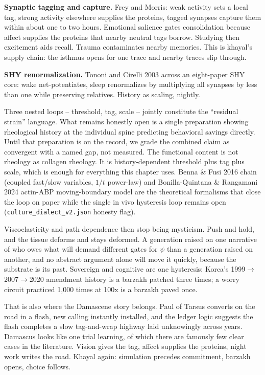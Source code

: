 \textbf{Synaptic tagging and capture.} Frey and Morris: weak activity sets a local tag, strong activity elsewhere supplies the proteins, tagged synapses capture them within about one to two hours. Emotional salience gates consolidation because affect supplies the proteins that nearby neutral tags borrow. Studying then excitement aids recall. Trauma contaminates nearby memories. This is khayal's supply chain: the isthmus opens for one trace and nearby traces slip through.

\textbf{SHY renormalization.} Tononi and Cirelli 2003 across an eight-paper SHY core: wake net-potentiates, sleep renormalizes by multiplying all synapses by less than one while preserving relatives. History as scaling, nightly.

Three nested loops -- threshold, tag, scale -- jointly constitute the ``residual strain'' language. What remains honestly open is a single preparation showing rheological history at the individual spine predicting behavioral savings directly. Until that preparation is on the record, we grade the combined claim as convergent with a named gap, not measured. The functional content is not rheology as collagen rheology. It is history-dependent threshold plus tag plus scale, which is enough for everything this chapter uses. Benna \& Fusi 2016 chain (coupled fast/slow variables, $1/t$ power-law) and Bonilla-Quintana \& Rangamani 2024 actin-ABP moving-boundary model are the theoretical formalisms that close the loop on paper while the single in vivo hysteresis loop remains open (\texttt{culture\_dialect\_v2.json} honesty flag).

Viscoelasticity and path dependence then stop being mysticism. Push and hold, and the tissue deforms and stays deformed. A generation raised on one narrative of who owes what will demand different gates for $\psi$ than a generation raised on another, and no abstract argument alone will move it quickly, because the substrate is its past. Sovereign and cognitive are one hysteresis: Korea's 1999$\to$2007$\to$2020 amendment history is a barzakh patched three times; a worry circuit practiced 1,000 times at 100x is a barzakh paved once.

That is also where the Damascene story belongs. Paul of Tarsus converts on the road in a flash, new calling instantly installed, and the ledger logic suggests the flash completes a slow tag-and-wrap highway laid unknowingly across years. Damascus looks like one trial learning, of which there are famously few clear cases in the literature. Vision gives the tag, affect supplies the proteins, night work writes the road. Khayal again: simulation precedes commitment, barzakh opens, choice follows.

